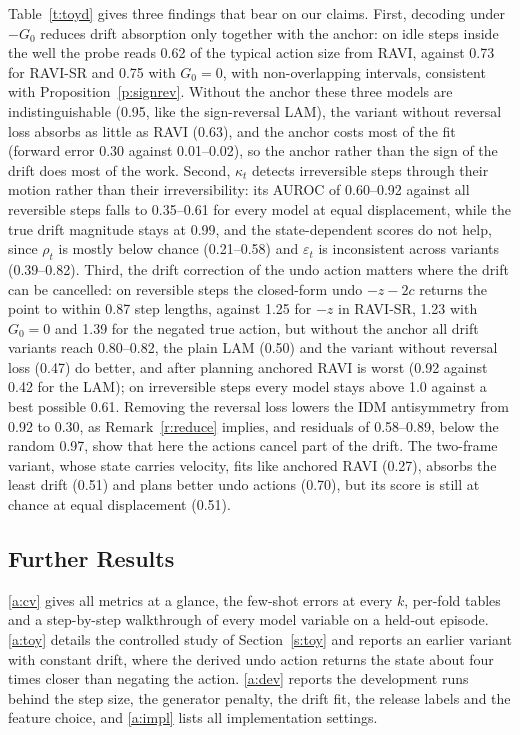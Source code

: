 \documentclass{jcse}
\newcommand{\method}{RAVI}
\begin{document}
Table~\ref{t:toyd} gives three findings that bear on our claims.
First, decoding under $-G_0$ reduces drift absorption only together with the anchor: on idle steps inside the well the probe reads 0.62 of the typical action size from {\method}, against 0.73 for {\method}-SR and 0.75 with $G_0=0$, with non-overlapping intervals, consistent with Proposition~\ref{p:signrev}. Without the anchor these three models are indistinguishable (0.95, like the sign-reversal LAM), the variant without reversal loss absorbs as little as {\method} (0.63), and the anchor costs most of the fit (forward error 0.30 against 0.01--0.02), so the anchor rather than the sign of the drift does most of the work.
Second, $\kappa_t$ detects irreversible steps through their motion rather than their irreversibility: its AUROC of 0.60--0.92 against all reversible steps falls to 0.35--0.61 for every model at equal displacement, while the true drift magnitude stays at 0.99, and the state-dependent scores do not help, since $\rho_t$ is mostly below chance (0.21--0.58) and $\varepsilon_t$ is inconsistent across variants (0.39--0.82).
Third, the drift correction of the undo action matters where the drift can be cancelled: on reversible steps the closed-form undo $-z-2c$ returns the point to within 0.87 step lengths, against 1.25 for $-z$ in {\method}-SR, 1.23 with $G_0=0$ and 1.39 for the negated true action, but without the anchor all drift variants reach 0.80--0.82, the plain LAM (0.50) and the variant without reversal loss (0.47) do better, and after planning anchored {\method} is worst (0.92 against 0.42 for the LAM); on irreversible steps every model stays above 1.0 against a best possible 0.61.
Removing the reversal loss lowers the IDM antisymmetry from 0.92 to 0.30, as Remark~\ref{r:reduce} implies, and residuals of 0.58--0.89, below the random 0.97, show that here the actions cancel part of the drift. The two-frame variant, whose state carries velocity, fits like anchored {\method} (0.27), absorbs the least drift (0.51) and plans better undo actions (0.70), but its score is still at chance at equal displacement (0.51).

\subsection{Further Results}
\ref{a:cv} gives all metrics at a glance, the few-shot errors at every $k$, per-fold tables and a step-by-step walkthrough of every model variable on a held-out episode.
\ref{a:toy} details the controlled study of Section~\ref{s:toy} and reports an earlier variant with constant drift, where the derived undo action returns the state about four times closer than negating the action.
\ref{a:dev} reports the development runs behind the step size, the generator penalty, the drift fit, the release labels and the feature choice, and \ref{a:impl} lists all implementation settings.
\end{document}
